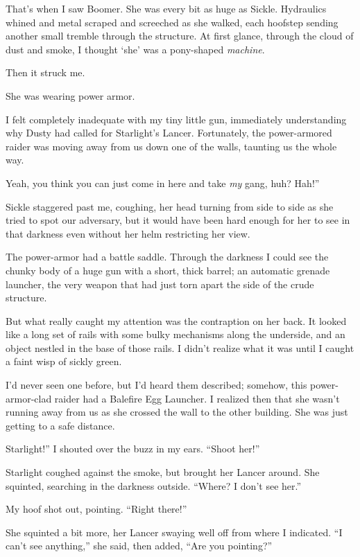 That’s when I saw Boomer. She was every bit as huge as Sickle. Hydraulics whined and metal scraped and screeched as she walked, each hoofstep sending another small tremble through the structure. At first glance, through the cloud of dust and smoke, I thought ‘she’ was a pony-shaped \textit{machine}.

Then it struck me.

She was wearing power armor.

I felt completely inadequate with my tiny little gun, immediately understanding why Dusty had called for Starlight’s Lancer. Fortunately, the power-armored raider was moving away from us down one of the walls, taunting us the whole way.

\leavevmode{}Yeah, you think you can just come in here and take \textit{my} gang, huh? Hah!”

Sickle staggered past me, coughing, her head turning from side to side as she tried to spot our adversary, but it would have been hard enough for her to see in that darkness even without her helm restricting her view.

The power-armor had a battle saddle. Through the darkness I could see the chunky body of a huge gun with a short, thick barrel; an automatic grenade launcher, the very weapon that had just torn apart the side of the crude structure.

But what really caught my attention was the contraption on her back. It looked like a long set of rails with some bulky mechanisms along the underside, and an object nestled in the base of those rails. I didn’t realize what it was until I caught a faint wisp of sickly green.

I’d never seen one before, but I’d heard them described; somehow, this power-armor-clad raider had a Balefire Egg Launcher. I realized then that she wasn’t running away from us as she crossed the wall to the other building. She was just getting to a safe distance.

\leavevmode{}Starlight!” I shouted over the buzz in my ears. “Shoot her!”

Starlight coughed against the smoke, but brought her Lancer around. She squinted, searching in the darkness outside. “Where? I don’t see her.”

My hoof shot out, pointing. “Right there!”

She squinted a bit more, her Lancer swaying well off from where I indicated. “I can’t see anything,” she said, then added, “Are you pointing?”

